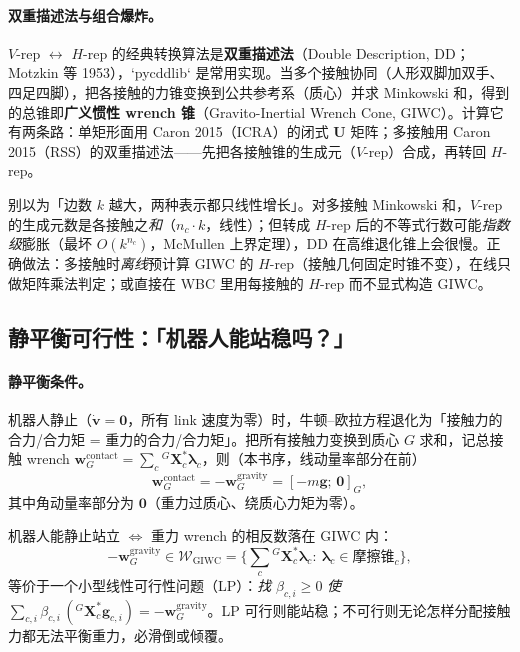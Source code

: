 \paragraph{双重描述法与组合爆炸。}
$V$-rep $\leftrightarrow$ $H$-rep 的经典转换算法是\textbf{双重描述法}（Double Description, DD；Motzkin 等 1953\cite{motzkin1953double}），`pycddlib` 是常用实现。当多个接触协同（人形双脚加双手、四足四脚），把各接触的力锥变换到公共参考系（质心）并求 Minkowski 和，得到的总锥即\textbf{广义惯性 wrench 锥}（Gravito-Inertial Wrench Cone, GIWC）。计算它有两条路：单矩形面用 Caron 2015（ICRA）的闭式 $\mathbf{U}$ 矩阵\cite{caron2015stability}；多接触用 Caron 2015（RSS）的双重描述法\cite{caron2015leveraging}——先把各接触锥的生成元（$V$-rep）合成，再转回 $H$-rep。

\begin{pitfall}
别以为「边数 $k$ 越大，两种表示都只线性增长」。对多接触 Minkowski 和，$V$-rep 的生成元数是各接触之\emph{和}（$n_c\cdot k$，线性）；但转成 $H$-rep 后的不等式行数可能\emph{指数级}膨胀（最坏 $O(k^{n_c})$，McMullen 上界定理），DD 在高维退化锥上会很慢。正确做法：多接触时\emph{离线}预计算 GIWC 的 $H$-rep（接触几何固定时锥不变），在线只做矩阵乘法判定；或直接在 WBC 里用每接触的 $H$-rep 而不显式构造 GIWC。
\end{pitfall}

\subsection{静平衡可行性：「机器人能站稳吗？」}
\label{subsec:static-equilibrium}

\paragraph{静平衡条件。}
机器人静止（$\dot{\boldsymbol{v}}=\boldsymbol{0}$，所有 link 速度为零）时，牛顿--欧拉方程退化为「接触力的合力/合力矩 = 重力的合力/合力矩」。把所有接触力变换到质心 $G$ 求和，记总接触 wrench $\boldsymbol{w}_G^{\mathrm{contact}}=\sum_c{}^G\mathbf{X}_c^*\boldsymbol{\lambda}_c$，则（本书序，线动量率部分在前）
\begin{equation}
  \boldsymbol{w}_G^{\mathrm{contact}}=-\boldsymbol{w}_G^{\mathrm{gravity}}=[-m\boldsymbol{g};\,\boldsymbol{0}]_G,
  \label{eq:static-balance}
\end{equation}
其中角动量率部分为 $\boldsymbol{0}$（重力过质心、绕质心力矩为零）。

\begin{theorem}
\label{thm:giwc-lp}
机器人能静止站立 $\iff$ 重力 wrench 的相反数落在 GIWC 内：
\begin{equation}
  -\boldsymbol{w}_G^{\mathrm{gravity}}\in\mathcal{W}_{\mathrm{GIWC}}=\Big\{\sum_c{}^G\mathbf{X}_c^*\boldsymbol{\lambda}_c:\ \boldsymbol{\lambda}_c\in\text{摩擦锥}_c\Big\},
  \label{eq:giwc}
\end{equation}
等价于一个小型线性可行性问题（LP）：\emph{找} $\beta_{c,i}\ge0$ \emph{使} $\sum_{c,i}\beta_{c,i}\,({}^G\mathbf{X}_c^*\boldsymbol{g}_{c,i})=-\boldsymbol{w}_G^{\mathrm{gravity}}$。LP 可行则能站稳；不可行则无论怎样分配接触力都无法平衡重力，必滑倒或倾覆。
\end{theorem}

